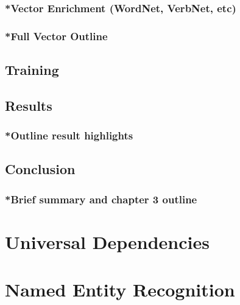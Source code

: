 \subsubsection{*Vector Enrichment (WordNet, VerbNet, etc)}
\subsubsection{*Full Vector Outline}
\subsection{Training}
\subsection{Results}
\subsubsection{*Outline result highlights}
\subsection{Conclusion}
\subsubsection{*Brief summary and chapter 3 outline}
\pagebreak

\section{Universal Dependencies}
\pagebreak

\section{Named Entity Recognition}
\pagebreak

